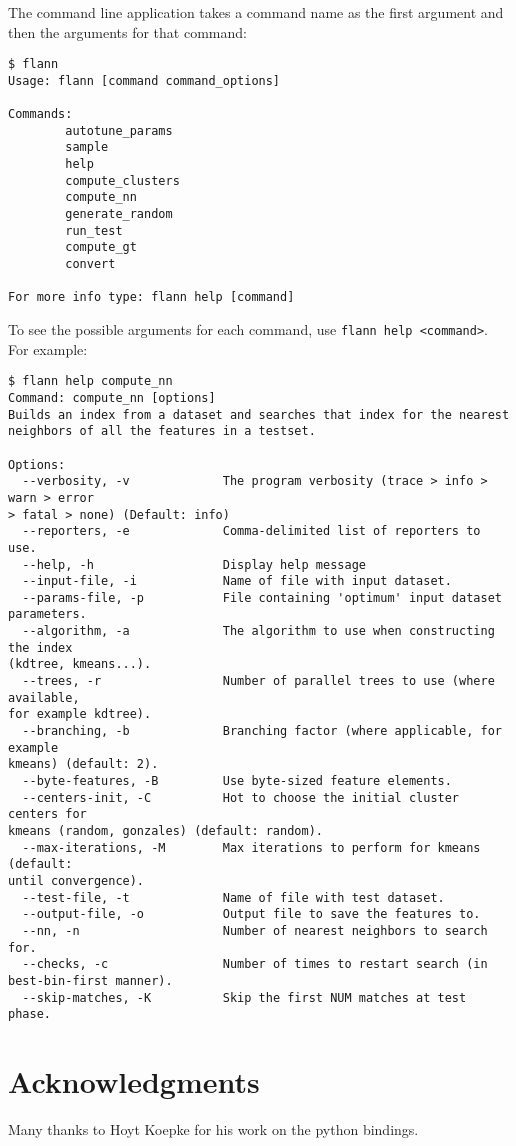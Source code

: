 \documentclass[letter,10pt]{article}
\begin{document}
The command line application takes a command name as the first argument and
then the arguments for that command:
\begin{Verbatim}[fontsize=\footnotesize,frame=single]
$ flann
Usage: flann [command command_options]

Commands:
        autotune_params
        sample
        help
        compute_clusters
        compute_nn
        generate_random
        run_test
        compute_gt
        convert

For more info type: flann help [command]
\end{Verbatim}

To see the possible arguments for each command, use \texttt{flann help
<command>}. For example:

\begin{Verbatim}[fontsize=\footnotesize,frame=single]
$ flann help compute_nn
Command: compute_nn [options]
Builds an index from a dataset and searches that index for the nearest
neighbors of all the features in a testset.

Options:
  --verbosity, -v             The program verbosity (trace > info > warn > error
> fatal > none) (Default: info)
  --reporters, -e             Comma-delimited list of reporters to use.
  --help, -h                  Display help message
  --input-file, -i            Name of file with input dataset.
  --params-file, -p           File containing 'optimum' input dataset
parameters.
  --algorithm, -a             The algorithm to use when constructing the index
(kdtree, kmeans...).
  --trees, -r                 Number of parallel trees to use (where available,
for example kdtree).
  --branching, -b             Branching factor (where applicable, for example
kmeans) (default: 2).
  --byte-features, -B         Use byte-sized feature elements.
  --centers-init, -C          Hot to choose the initial cluster centers for
kmeans (random, gonzales) (default: random).
  --max-iterations, -M        Max iterations to perform for kmeans (default:
until convergence).
  --test-file, -t             Name of file with test dataset.
  --output-file, -o           Output file to save the features to.
  --nn, -n                    Number of nearest neighbors to search for.
  --checks, -c                Number of times to restart search (in
best-bin-first manner).
  --skip-matches, -K          Skip the first NUM matches at test phase.

\end{Verbatim}


\section{Acknowledgments}

Many thanks to Hoyt Koepke for his work on the python bindings.
\end{document}
